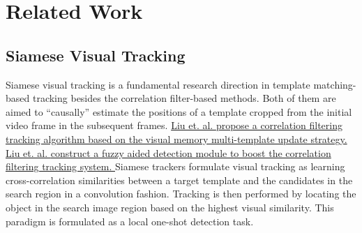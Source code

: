 \documentclass[journal]{IEEEtran}
\begin{document}

\section{Related Work}

\subsection{Siamese Visual Tracking}

Siamese visual tracking is a fundamental research direction in template matching-based tracking besides the correlation filter-based methods. Both of them are aimed to ``causally'' estimate the positions of a template cropped from the initial video frame in the subsequent frames.
\uline{
Liu et. al. \cite{9376997} propose a correlation filtering tracking algorithm based on the visual memory multi-template update strategy.
Liu et. al. \cite{9132673} construct a fuzzy aided detection module to boost the correlation filtering tracking system.
}
Siamese trackers formulate visual tracking as learning cross-correlation similarities between a target template and the candidates in the search region in a convolution fashion. Tracking is then performed by locating the object in the search image region based on the highest visual similarity. This paradigm is formulated as a local one-shot detection task.
\end{document}
